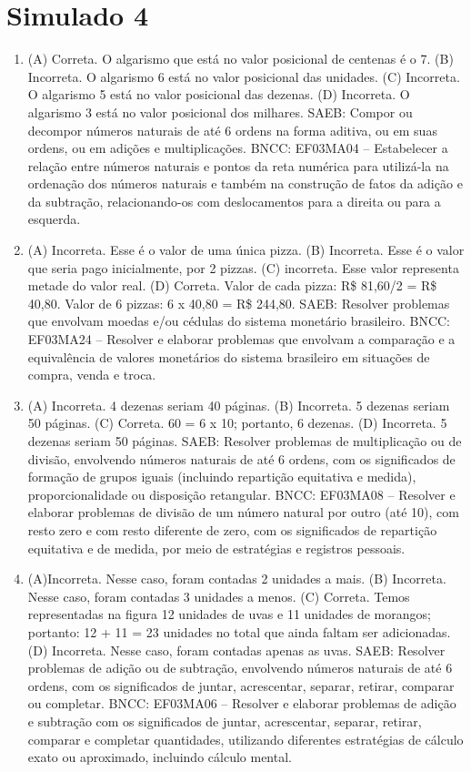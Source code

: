 \section*{Simulado 4}

\begin{enumerate}
\item
(A) Correta. O algarismo que está no valor posicional de centenas é o 7.
(B) Incorreta. O algarismo 6 está no valor posicional das unidades.
(C) Incorreta. O algarismo 5 está no valor posicional das dezenas.
(D) Incorreta. O algarismo 3 está no valor posicional dos milhares.
SAEB: Compor ou decompor números naturais de até 6 ordens na forma aditiva, ou em suas ordens, ou em adições e multiplicações.
BNCC: EF03MA04 -- Estabelecer a relação entre números naturais e pontos da reta numérica para
utilizá-la na ordenação dos números naturais e também na construção de fatos da adição e da
subtração, relacionando-os com deslocamentos para a direita ou para a esquerda.

\item
(A) Incorreta. Esse é o valor de uma única pizza.
(B) Incorreta. Esse é o valor que seria pago inicialmente, por 2 pizzas.
(C) incorreta. Esse valor representa metade do valor real.
(D) Correta. Valor de cada pizza: R\$ 81,60/2 = R\$ 40,80. Valor de 6 pizzas: 6 x 40,80 = R\$ 244,80.
SAEB: Resolver problemas que envolvam moedas e/ou cédulas do sistema monetário brasileiro.
BNCC: EF03MA24 -- Resolver e elaborar problemas que envolvam a comparação e a equivalência de
valores monetários do sistema brasileiro em situações de compra, venda e troca.

\item
(A) Incorreta. 4 dezenas seriam 40 páginas.
(B) Incorreta. 5 dezenas seriam 50 páginas.
(C) Correta. 60 = 6 x 10; portanto, 6 dezenas.
(D) Incorreta. 5 dezenas seriam 50 páginas.
SAEB: Resolver problemas de multiplicação ou de divisão, envolvendo números naturais de até 6 ordens, com os significados de formação de grupos iguais (incluindo repartição equitativa e medida),
proporcionalidade ou disposição retangular.
BNCC: EF03MA08 -- Resolver e elaborar problemas de divisão de um número natural por outro (até
10), com resto zero e com resto diferente de zero, com os significados de repartição equitativa
e de medida, por meio de estratégias e registros pessoais.

\item
(A)Incorreta. Nesse caso, foram contadas 2 unidades a mais.
(B) Incorreta. Nesse caso, foram contadas 3 unidades a menos.
(C) Correta. Temos representadas na figura 12 unidades de uvas e 11 unidades de morangos; portanto: 12 + 11 = 23 unidades no total que ainda faltam ser adicionadas.
(D) Incorreta. Nesse caso, foram contadas apenas as uvas.
SAEB: Resolver problemas de adição ou de subtração,
envolvendo números naturais de até 6 ordens, com os significados de
juntar, acrescentar, separar, retirar, comparar ou completar.
BNCC: EF03MA06 – Resolver e elaborar problemas de adição e subtração com os significados de
juntar, acrescentar, separar, retirar, comparar e completar quantidades, utilizando diferentes
estratégias de cálculo exato ou aproximado, incluindo cálculo mental.


\end{enumerate}
